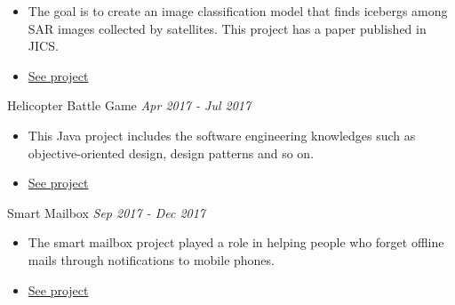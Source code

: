 \documentclass[10pt]{article}
\newenvironment{changemargin}[2]{
  \begin{list}{}{
    \setlength{\topsep}{0pt}
    \setlength{\leftmargin}{#1}
    \setlength{\rightmargin}{#2}
    \setlength{\listparindent}{\parindent}
    \setlength{\itemindent}{\parindent}
    \setlength{\parsep}{\parskip}
  }
  \item[]}{\end{list}
}
\newcommand{\project}[2]{
	{#1} \hfill \emph{#2}\\ \medskip
}
\newenvironment{body} {
	\vspace*{-16pt}
	\begin{changemargin}{-0.25in}{-0.5in}
  }
	{\end{changemargin}
}
\begin{document}
\begin{body}
\begin{itemize}
      \item  The goal is to create an image classification model that finds icebergs among SAR images collected by satellites. This project has a paper published in JICS.
      \item \href{https://github.com/jeongwhanchoi/MLND-Capstone-Project}{See project}
  	\end{itemize}
\project{Helicopter Battle Game}{Apr 2017 - Jul 2017}
\begin{itemize} \itemsep -0pt  %
      \item  This Java project includes the software engineering knowledges such as objective-oriented design, design patterns and so on.
      \item \href{https://github.com/jeongwhanchoi/helicopter_battle}{See project}
  	\end{itemize}
\project{Smart Mailbox}{Sep 2017 - Dec 2017}
\begin{itemize} \itemsep -0pt  %
      \item  The smart mailbox project played a role in helping people who forget offline mails through notifications to mobile phones.
      \item \href{https://github.com/jeongwhanchoi/Smart-Mailbox}{See project}
  	\end{itemize}	
\end{body}


\medskip
\end{document}
